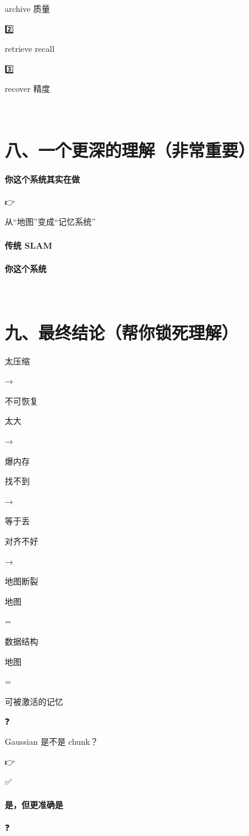 \documentclass[12pt]{article}
\begin{document}
archive 质量

2️⃣

retrieve recall

3️⃣

recover 精度

🧠

\section{八、一个更深的理解（非常重要）}
\paragraph{你这个系统其实在做}
👉

从“地图”变成“记忆系统”

\paragraph{传统 SLAM}
\paragraph{你这个系统}
🧭

\section{九、最终结论（帮你锁死理解）}
太压缩

→

不可恢复

太⼤

→

爆内存

找不到

→

等于丢

对⻬不好

→

地图断裂

地图

=

数据结构

地图

=

可被激活的记忆

❓

Gaussian 是不是 chunk？

👉

✅

\paragraph{是，但更准确是}
❓
\end{document}
